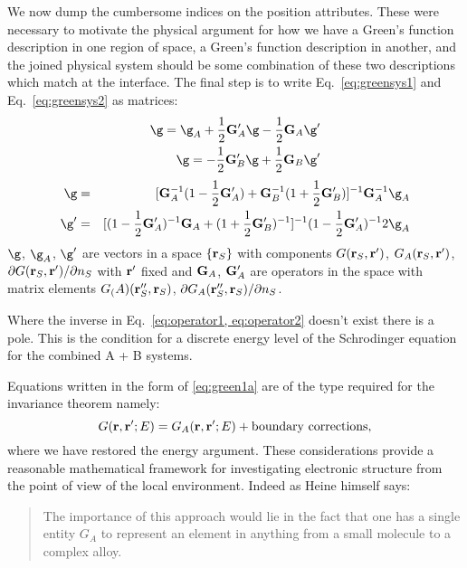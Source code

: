 We now dump the cumbersome indices on the position attributes. These
were necessary to motivate the physical argument for how we have a Green's function
description in one region of space, a Green's function description in another, 
and the joined physical system should be some combination of these two descriptions
which match at the interface. The final step is to write Eq.~\ref{eq:greensys1} 
and Eq.~\ref{eq:greensys2} as matrices:
%
\begin{eqnarray}
\label{eq:operator1}
\g = \g_{A} + \frac{1}{2}\G'_{A}\g - \frac{1}{2}\G_{A}\g' \\
\g = -\frac{1}{2}\G'_{B}\g + \frac{1}{2}\G_{B}\g' \\
\end{eqnarray}
%
\begin{eqnarray}
\label{eq:operator2}
\g & = & [\G^{-1}_{A}(1-\frac{1}{2}\G'_{A}) + \G^{-1}_{B}(1+\frac{1}{2}\G'_{B})]^{-1} \G^{-1}_{A}\g_{A} \\
\g' & = & [(1-\frac{1}{2}\G'_{A})^{-1}\G_{A} + (1+\frac{1}{2}\G'_{B})^{-1}]^{-1}(1 - \frac{1}{2}\G'_{A})^{-1}2\g_{A}
\end{eqnarray}
%
$\g$, $\g_{A}$, $\g'$ are vectors in a space $\{{\bf r}_{S}\}$ with components $G({\bf r}_{S},{\bf r}')$,
$G_{A}({\bf r}_{S},{\bf r}')$, $\partial G({\bf r}_{S},{\bf r}')/\partial n_{S}$ with ${\bf r}'$ fixed and
${\bf G}_{A}$, ${\bf G}'_{A}$ are operators in the space with matrix elements
$G_(A)({\bf r}''_{S}, {\bf r}_{S})$, $\partial G_{A}({\bf r}''_{S}, {\bf r}_{S})/\partial n_{S}$.

Where the inverse in Eq.~\ref{eq:operator1, eq:operator2} 
doesn't exist there is a pole. This is the condition for a discrete energy level 
of the Schrodinger equation for the combined A + B systems. 

Equations written in the form of \ref{eq:green1a} are of the type required for the invariance theorem namely:
%
\begin{equation}
G({\bf r},{\bf r}';E) = G_{A}({\bf r},{\bf r}';E) + {\rm boundary ~ corrections},
\end{equation}
%
where we have restored the energy argument.
These considerations provide a reasonable mathematical framework for 
investigating electronic structure from the point of view of the local environment.
Indeed as Heine himself says: 

\begin{quote}
The importance of this approach would lie in the fact that
one has a single entity $G_{A}$ to represent an element in anything 
from a small molecule to a complex alloy.
\end{quote}

